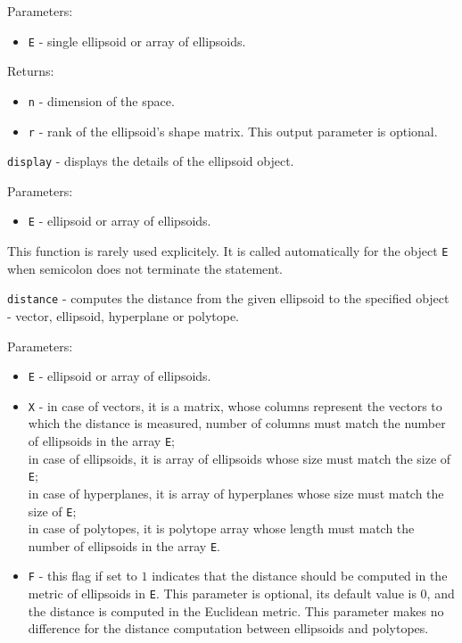 \documentclass{report}
\begin{document}
Parameters:
\begin{itemize}
\item {\tt E} - single ellipsoid or array of ellipsoids.
\end{itemize}

Returns:
\begin{itemize}
\item {\tt n} - dimension of the space.
\item {\tt r} - rank of the ellipsoid's shape matrix. This output parameter
is optional.
\end{itemize}



\newpage

{\Large {\tt display}} - displays the details of the ellipsoid object.

Parameters:
\begin{itemize}
\item {\tt E} - ellipsoid or array of ellipsoids.
\end{itemize}
This function is rarely used explicitely. It is called automatically
for the object {\tt E} when semicolon does not terminate the statement.

\newpage

{\Large {\tt distance}} - computes the distance from the given ellipsoid
to the specified object - vector, ellipsoid, hyperplane or polytope.

Parameters:
\begin{itemize}
\item {\tt E} - ellipsoid or array of ellipsoids.
\item {\tt X} - in case of vectors, it is a matrix, whose columns represent
the vectors to which the distance is measured, number of columns must match
the number of ellipsoids in the array {\tt E};\\
in case of ellipsoids, it is array of ellipsoids whose size must match the
size of {\tt E};\\
in case of hyperplanes, it is array of hyperplanes whose size must match the
size of {\tt E};\\
in case of polytopes, it is polytope array whose length must match
the number of ellipsoids in the array {\tt E}.
\item {\tt F} - this flag if set to $1$ indicates that the distance should
be computed in the metric of ellipsoids in {\tt E}. This parameter is optional,
its default value is $0$, and the distance is computed in the Euclidean metric.
This parameter makes no difference for the distance computation
between ellipsoids and polytopes.
\end{itemize}
\end{document}
